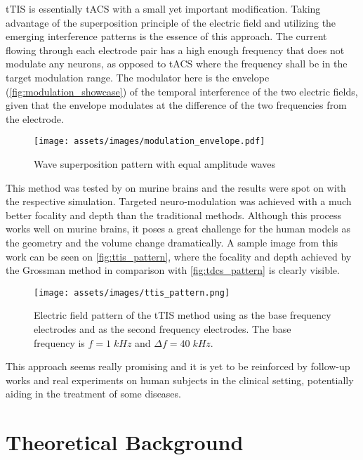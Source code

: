 \gls{tTIS} is essentially \gls{tACS} with a small yet important modification. Taking advantage of the superposition principle of the electric field and utilizing the emerging interference patterns is the essence of this approach. The current flowing through each electrode pair has a high enough frequency that does not modulate any neurons, as opposed to \gls{tACS} where the frequency shall be in the target modulation range. The modulator here is the envelope (\autoref{fig:modulation_showcase}) of the temporal interference of the two electric fields, given that the envelope modulates at the difference of the two frequencies from the electrode.
\begin{figure}[H]
    \centering
    \texttt{[image: assets/images/modulation\_envelope.pdf]}
    \caption{Wave superposition pattern with equal amplitude waves}
    \label{fig:modulation_showcase}
\end{figure}

This method was tested by  on murine brains and the results were spot on with the respective simulation. Targeted neuro-modulation was achieved with a much better focality and depth than the traditional methods. Although this process works well on murine brains, it poses a great challenge for the human models as the geometry and the volume change dramatically. A sample image from this work can be seen on \autoref{fig:ttis_pattern}, where the focality and depth achieved by the Grossman method in comparison with \autoref{fig:tdcs_pattern} is clearly visible.

\begin{figure}[H]
    \centering
    \texttt{[image: assets/images/ttis\_pattern.png]}
    \caption{Electric field pattern of the \gls{tTIS} method using  as the base frequency electrodes and  as the second frequency electrodes. The base frequency is $f = 1\; kHz$ and $\Delta f=40\; kHz$.}
    \label{fig:ttis_pattern}
\end{figure}

This approach seems really promising and it is yet to be reinforced by follow-up works and real experiments on human subjects in the clinical setting, potentially aiding in the treatment of some diseases.

\section{Theoretical Background}


